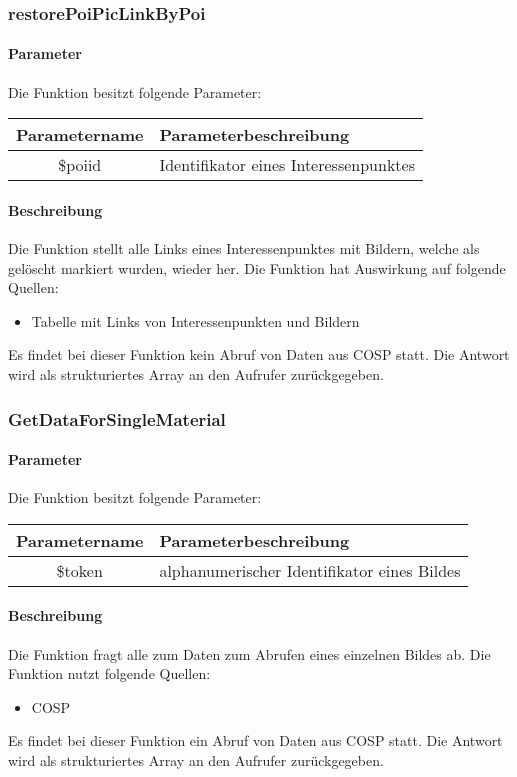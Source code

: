 \subsubsection{restorePoiPicLinkByPoi}
\paragraph{Parameter} Die Funktion besitzt folgende Parameter:
\begin{table}[H]
	\begin{tabular}{|c|p{11cm}|}
		\hline
		\textbf{Parametername} & \textbf{Parameterbeschreibung} \\ \hline
		\$poiid     & Identifikator eines Interessenpunktes \\ \hline
	\end{tabular}
\end{table}
\paragraph{Beschreibung} Die Funktion stellt alle Links eines Interessenpunktes mit Bildern, welche als gelöscht markiert wurden, wieder her. Die Funktion hat Auswirkung auf folgende Quellen:
\begin{itemize}
	\item Tabelle mit Links von Interessenpunkten und Bildern
\end{itemize}
Es findet bei dieser Funktion kein Abruf von Daten aus {\glqq COSP\grqq} statt. Die Antwort wird als strukturiertes Array an den Aufrufer zurückgegeben.
\subsubsection{GetDataForSingleMaterial}
\paragraph{Parameter} Die Funktion besitzt folgende Parameter:
\begin{table}[H]
	\begin{tabular}{|c|p{11cm}|}
		\hline
		\textbf{Parametername} & \textbf{Parameterbeschreibung} \\ \hline
		\$token & alphanumerischer Identifikator eines Bildes \\ \hline
	\end{tabular}
\end{table}
\paragraph{Beschreibung} Die Funktion fragt alle zum Daten zum Abrufen eines einzelnen Bildes ab. Die Funktion nutzt folgende Quellen:
\begin{itemize}
	\item COSP
\end{itemize}
Es findet bei dieser Funktion ein Abruf von Daten aus {\glqq COSP\grqq} statt. Die Antwort wird als strukturiertes Array an den Aufrufer zurückgegeben.
